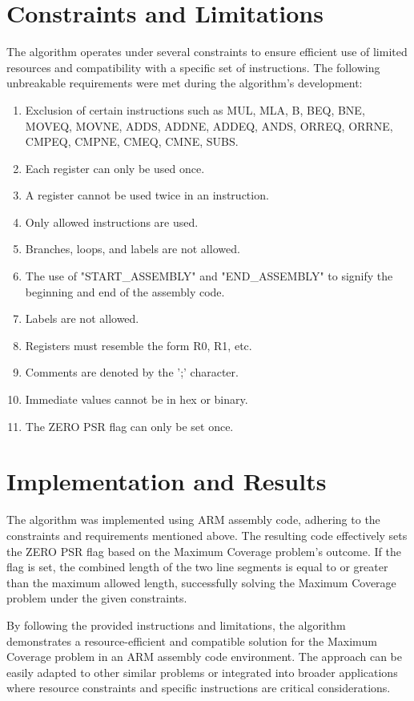 {\section{Constraints and Limitations}
The algorithm operates under several constraints to ensure efficient use of limited resources and compatibility with a specific set of instructions. The following unbreakable requirements were met during the algorithm's development:

\begin{enumerate}
    \item Exclusion of certain instructions such as MUL, MLA, B, BEQ, BNE, MOVEQ, MOVNE, ADDS, ADDNE, ADDEQ, ANDS, ORREQ, ORRNE, CMPEQ, CMPNE, CMEQ, CMNE, SUBS.
    \item Each register can only be used once.
    \item A register cannot be used twice in an instruction.
    \item Only allowed instructions are used.
    \item Branches, loops, and labels are not allowed.
    \item The use of "START\_ASSEMBLY" and "END\_ASSEMBLY" to signify the beginning and end of the assembly code.
    \item Labels are not allowed.
    \item Registers must resemble the form R0, R1, etc.
    \item Comments are denoted by the ';' character.
    \item Immediate values cannot be in hex or binary.
    \item The ZERO PSR flag can only be set once.
\end{enumerate}

\section{Implementation and Results}
The algorithm was implemented using ARM assembly code, adhering to the constraints and requirements mentioned above. The resulting code effectively sets the ZERO PSR flag based on the Maximum Coverage problem's outcome. If the flag is set, the combined length of the two line segments is equal to or greater than the maximum allowed length, successfully solving the Maximum Coverage problem under the given constraints.

By following the provided instructions and limitations, the algorithm demonstrates a resource-efficient and compatible solution for the Maximum Coverage problem in an ARM assembly code environment. The approach can be easily adapted to other similar problems or integrated into broader applications where resource constraints and specific instructions are critical considerations.

}
